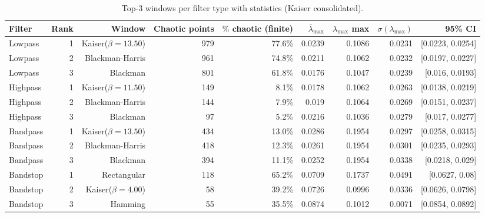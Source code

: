 \begin{table}[htbp]
  \centering
  \caption{Top-3 windows per filter type with statistics (Kaiser consolidated).}
  \begin{tabular}{lrrrrrrrr}
    \toprule
    Filter & Rank & Window & Chaotic points & $\%$ chaotic (finite) & $\overline{\lambda}_{\max}$ & $\lambda_{\max}$ max & $\sigma(\lambda_{\max})$ & 95\% CI \\
    \midrule
    Lowpass & 1 & Kaiser($\beta=13.50$) & 979 & 77.6\% & 0.0239 & 0.1086 & 0.0231 & [0.0223, 0.0254] \\
    Lowpass & 2 & Blackman-Harris & 961 & 74.8\% & 0.0211 & 0.1062 & 0.0232 & [0.0197, 0.0227] \\
    Lowpass & 3 & Blackman & 801 & 61.8\% & 0.0176 & 0.1047 & 0.0239 & [0.016, 0.0193] \\
    Highpass & 1 & Kaiser($\beta=11.50$) & 149 & 8.1\% & 0.0178 & 0.1062 & 0.0263 & [0.0138, 0.0219] \\
    Highpass & 2 & Blackman-Harris & 144 & 7.9\% & 0.019 & 0.1064 & 0.0269 & [0.0151, 0.0237] \\
    Highpass & 3 & Blackman & 97 & 5.2\% & 0.0216 & 0.1036 & 0.0279 & [0.017, 0.0277] \\
    Bandpass & 1 & Kaiser($\beta=13.50$) & 434 & 13.0\% & 0.0286 & 0.1954 & 0.0297 & [0.0258, 0.0315] \\
    Bandpass & 2 & Blackman-Harris & 418 & 12.3\% & 0.0261 & 0.1954 & 0.0301 & [0.0235, 0.0293] \\
    Bandpass & 3 & Blackman & 394 & 11.1\% & 0.0252 & 0.1954 & 0.0338 & [0.0218, 0.029] \\
    Bandstop & 1 & Rectangular & 118 & 65.2\% & 0.0709 & 0.1737 & 0.0491 & [0.0627, 0.08] \\
    Bandstop & 2 & Kaiser($\beta=4.00$) & 58 & 39.2\% & 0.0726 & 0.0996 & 0.0336 & [0.0626, 0.0798] \\
    Bandstop & 3 & Hamming & 55 & 35.5\% & 0.0874 & 0.1012 & 0.0071 & [0.0854, 0.0892] \\
    \bottomrule
  \end{tabular}
\end{table}

